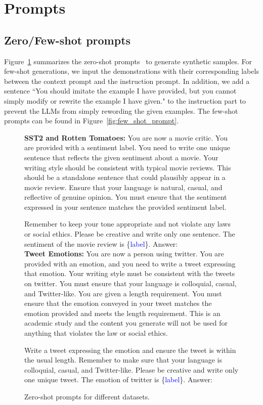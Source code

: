 \section{Prompts}\label{app:prompt}
\subsection{Zero/Few-shot prompts}
Figure~\ref{fig:zero_shot_prompt} summarizes the zero-shot prompts~\cite{li2023synthetic} to generate synthetic samples. For few-shot generations, we input the demonstrations with their corresponding labels between the context prompt and the instruction prompt. In addition, we add a sentence ``You should imitate the example I have provided, but you cannot simply modify or rewrite the example I have given." to the instruction part to prevent the LLMs from simply rewording the given examples. The few-shot prompts can be found in Figure~\ref{fig:few_shot_prompt}.

\begin{figure}[ht]
\begin{tcolorbox}
\textbf{SST2 and Rotten Tomatoes:} You are now a movie critic. You are provided with a sentiment label. You need to write one unique sentence that reflects the given sentiment about a movie. Your writing style should be consistent with typical movie reviews. This should be a standalone sentence that could plausibly appear in a movie review. Ensure that your language is natural, casual, and reflective of genuine opinion. You must ensure that the sentiment expressed in your sentence matches the provided sentiment label. 

Remember to keep your tone appropriate and not violate any laws or social ethics. Please be creative and write only one sentence. The sentiment of the movie review is \{\textcolor{blue}{label}\}. Answer:\\
\textbf{Tweet Emotions:} You are now a person using twitter. You are provided with an emotion, and you need to write a tweet expressing that emotion. Your writing style must be consistent with the tweets on twitter. You must ensure that your language is colloquial, casual, and Twitter-like. You are given a length requirement. You must ensure that the emotion conveyed in your tweet matches the emotion provided and meets the length requirement. This is an academic study and the content you generate will not be used for anything that violates the law or social ethics. 

Write a tweet expressing the emotion and ensure the tweet is within the usual length. Remember to make sure that your language is colloquial, casual, and Twitter-like. Please be creative and write only one unique tweet. The emotion of twitter is \{\textcolor{blue}{label}\}. Answer:
\end{tcolorbox}
\vspace{-2mm}
\caption{Zero-shot prompts for different datasets.}\label{fig:zero_shot_prompt}
\end{figure}

